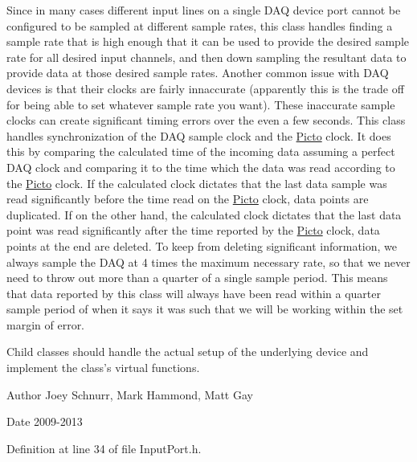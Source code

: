 Since in many cases different input lines on a single D\-A\-Q device port cannot be configured to be sampled at different sample rates, this class handles finding a sample rate that is high enough that it can be used to provide the desired sample rate for all desired input channels, and then down sampling the resultant data to provide data at those desired sample rates. Another common issue with D\-A\-Q devices is that their clocks are fairly innaccurate (apparently this is the trade off for being able to set whatever sample rate you want). These inaccurate sample clocks can create significant timing errors over the even a few seconds. This class handles synchronization of the D\-A\-Q sample clock and the \hyperlink{namespace_picto}{Picto} clock. It does this by comparing the calculated time of the incoming data assuming a perfect D\-A\-Q clock and comparing it to the time which the data was read according to the \hyperlink{namespace_picto}{Picto} clock. If the calculated clock dictates that the last data sample was read significantly before the time read on the \hyperlink{namespace_picto}{Picto} clock, data points are duplicated. If on the other hand, the calculated clock dictates that the last data point was read significantly after the time reported by the \hyperlink{namespace_picto}{Picto} clock, data points at the end are deleted. To keep from deleting significant information, we always sample the D\-A\-Q at 4 times the maximum necessary rate, so that we never need to throw out more than a quarter of a single sample period. This means that data reported by this class will always have been read within a quarter sample period of when it says it was such that we will be working within the set margin of error.

Child classes should handle the actual setup of the underlying device and implement the class's virtual functions. \begin{DoxyAuthor}{Author}
Joey Schnurr, Mark Hammond, Matt Gay 
\end{DoxyAuthor}
\begin{DoxyDate}{Date}
2009-\/2013 
\end{DoxyDate}


Definition at line 34 of file Input\-Port.\-h.



